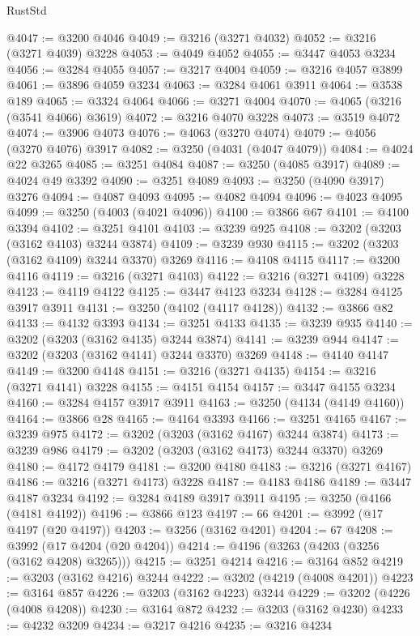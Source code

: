 \begin{lexlean}{RustStd}
\begin{coremodule}
@4047 := @3200 @4046
@4049 := @3216 (@3271 @4032)
@4052 := @3216 (@3271 @4039) @3228
@4053 := @4049 @4052
@4055 := @3447 @4053 @3234
@4056 := @3284 @4055
@4057 := @3217 @4004
@4059 := @3216 @4057 @3899
@4061 := @3896 @4059 @3234
@4063 := @3284 @4061 @3911
@4064 := @3538 @189
@4065 := @3324 @4064
@4066 := @3271 @4004
@4070 := @4065 (@3216 (@3541 @4066) @3619)
@4072 := @3216 @4070 @3228
@4073 := @3519 @4072
@4074 := @3906 @4073
@4076 := @4063 (@3270 @4074)
@4079 := @4056 (@3270 @4076) @3917
@4082 := @3250 (@4031 (@4047 @4079))
@4084 := @4024 @22 @3265
@4085 := @3251 @4084
@4087 := @3250 (@4085 @3917)
@4089 := @4024 @49 @3392
@4090 := @3251 @4089
@4093 := @3250 (@4090 @3917) @3276
@4094 := @4087 @4093
@4095 := @4082 @4094
@4096 := @4023 @4095
@4099 := @3250 (@4003 (@4021 @4096))
@4100 := @3866 @67
@4101 := @4100 @3394
@4102 := @3251 @4101
@4103 := @3239 @925
@4108 := @3202 (@3203 (@3162 @4103) @3244 @3874)
@4109 := @3239 @930
@4115 := @3202 (@3203 (@3162 @4109) @3244 @3370) @3269
@4116 := @4108 @4115
@4117 := @3200 @4116
@4119 := @3216 (@3271 @4103)
@4122 := @3216 (@3271 @4109) @3228
@4123 := @4119 @4122
@4125 := @3447 @4123 @3234
@4128 := @3284 @4125 @3917 @3911
@4131 := @3250 (@4102 (@4117 @4128))
@4132 := @3866 @82
@4133 := @4132 @3393
@4134 := @3251 @4133
@4135 := @3239 @935
@4140 := @3202 (@3203 (@3162 @4135) @3244 @3874)
@4141 := @3239 @944
@4147 := @3202 (@3203 (@3162 @4141) @3244 @3370) @3269
@4148 := @4140 @4147
@4149 := @3200 @4148
@4151 := @3216 (@3271 @4135)
@4154 := @3216 (@3271 @4141) @3228
@4155 := @4151 @4154
@4157 := @3447 @4155 @3234
@4160 := @3284 @4157 @3917 @3911
@4163 := @3250 (@4134 (@4149 @4160))
@4164 := @3866 @28
@4165 := @4164 @3393
@4166 := @3251 @4165
@4167 := @3239 @975
@4172 := @3202 (@3203 (@3162 @4167) @3244 @3874)
@4173 := @3239 @986
@4179 := @3202 (@3203 (@3162 @4173) @3244 @3370) @3269
@4180 := @4172 @4179
@4181 := @3200 @4180
@4183 := @3216 (@3271 @4167)
@4186 := @3216 (@3271 @4173) @3228
@4187 := @4183 @4186
@4189 := @3447 @4187 @3234
@4192 := @3284 @4189 @3917 @3911
@4195 := @3250 (@4166 (@4181 @4192))
@4196 := @3866 @123
@4197 := 66
@4201 := @3992 (@17 @4197 (@20 @4197))
@4203 := @3256 (@3162 @4201)
@4204 := 67
@4208 := @3992 (@17 @4204 (@20 @4204))
@4214 := @4196 (@3263 (@4203 (@3256 (@3162 @4208) @3265)))
@4215 := @3251 @4214
@4216 := @3164 @852
@4219 := @3203 (@3162 @4216) @3244
@4222 := @3202 (@4219 (@4008 @4201))
@4223 := @3164 @857
@4226 := @3203 (@3162 @4223) @3244
@4229 := @3202 (@4226 (@4008 @4208))
@4230 := @3164 @872
@4232 := @3203 (@3162 @4230)
@4233 := @4232 @3209
@4234 := @3217 @4216
@4235 := @3216 @4234

\end{coremodule}
\end{lexlean}
